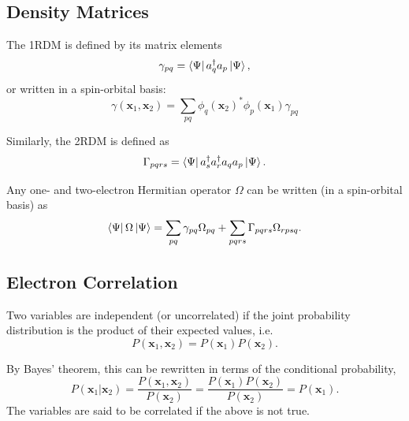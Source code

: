 \subsection{Density Matrices}
\label{sec:density-matrices}

The \gls{1RDM} is defined by its matrix elements
\begin{equation}
    \gamma_{pq} = \bra{\Psi}a_q^\dag a_p \ket{\Psi},
\end{equation}
or written in a spin-orbital basis:
\begin{equation}
    \label{eq:one-rdm}
    \gamma(\bm x_1, \bm x_2) = \sum_{pq} \phi_q(\bm x_2)^*\phi_p(\bm x_1) \gamma_{pq}
\end{equation}

Similarly, the \gls{2RDM} is defined as
\begin{equation}
    \label{eq:two-rdm}
    \Gamma_{pqrs} = \bra{\Psi}a_s^\dag a_r^\dag a_q a_p \ket{\Psi}.
\end{equation}

Any one- and two-electron Hermitian operator $\Omega$ can be written (in a spin-orbital basis) as
\begin{equation}
    \label{eq:rdm-expectation}
    \bra{\Psi}\Omega\ket{\Psi} = \sum_{pq} \gamma_{pq}\Omega_{pq} + \sum_{pqrs} \Gamma_{pqrs}\Omega_{rpsq}.
\end{equation}

\subsection{Electron Correlation}
\label{sec:correlation}

Two variables are independent (or uncorrelated) if the joint probability distribution is the product of their expected values, i.e.
\begin{equation}
    P(\bm x_1, \bm x_2) = P(\bm x_1)P(\bm x_2).
\end{equation}

By Bayes' theorem,\cite{hastieElements2009b,bayesLII1997} this can be rewritten in terms of the conditional probability,
\begin{equation}
    P(\bm x_1|\bm x_2) = \frac{P(\bm x_1, \bm x_2)}{P(\bm x_2)} = \frac{P(\bm x_1)P(\bm x_2)}{P(\bm x_2)} = P(\bm x_1).
\end{equation}
The variables are said to be correlated if the above is not true.

